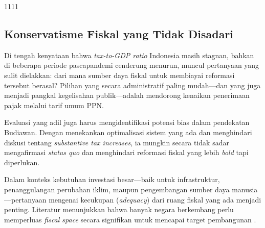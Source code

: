\begin{table}[hbt!]
\caption{Potensi Pajak dan \textit{Tax Effort} Berdasarkan Kelompok Negara (2020)}
\label{tab:tax_potential_effort}
\centering
\begin{tabular}{1111}
\end{tabular}
\end{table}   

\subsection{Konservatisme Fiskal yang Tidak Disadari}
Di tengah kenyataan bahwa \textit{tax-to-GDP ratio} Indonesia masih stagnan, bahkan di beberapa periode pascapandemi cenderung menurun, muncul pertanyaan yang sulit dielakkan: dari mana sumber daya fiskal untuk membiayai reformasi tersebut berasal? Pilihan yang secara administratif paling mudah—dan yang juga menjadi pangkal kegelisahan publik—adalah mendorong kenaikan penerimaan pajak melalui tarif umum PPN.

Evaluasi yang adil juga harus mengidentifikasi potensi bias dalam pendekatan Budiawan. Dengan menekankan optimalisasi sistem yang ada dan menghindari diskusi tentang \textit{substantive tax increases}, ia mungkin secara tidak sadar mengafirmasi \textit{status quo} dan menghindari reformasi fiskal yang lebih \textit{bold} tapi diperlukan.

Dalam konteks kebutuhan investasi besar—baik untuk infrastruktur, penanggulangan perubahan iklim, maupun pengembangan sumber daya manusia—pertanyaan mengenai kecukupan (\textit{adequacy}) dari ruang fiskal yang ada menjadi penting. Literatur menunjukkan bahwa banyak negara berkembang perlu memperluas \textit{fiscal space} secara signifikan untuk mencapai target pembangunan \citep{murshed_2020_fiscal}.

